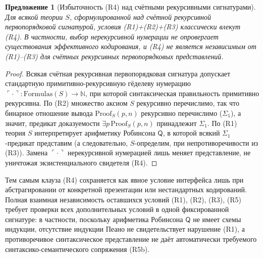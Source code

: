 \documentclass[11pt]{article}
\theoremstyle{plain}
\newtheorem{proposition}[theorem]{Предложение}
\theoremstyle{definition}
\begin{document}
\begin{proposition}[Избыточность (R4) над счётными рекурсивными сигнатурами]\label{prop:rs-independence}
Для всякой теории $S$, сформулированной над счётной рекурсивной первопорядковой сигнатурой, условия \textup{(R1)+(R2)+(R3)} классически влекут \textup{(R4)}. В частности, выбор нерекурсивной нумерации не опровергает существования эффективного кодирования, и \textup{(R4)} не является независимым от \textup{(R1)--(R3)} для счётных рекурсивных первопорядковых представлений.
\end{proposition}
\begin{proof}
Всякая счётная рекурсивная первопорядковая сигнатура допускает стандартную примитивно-рекурсивную гёделеву нумерацию $\ulcorner \cdot \urcorner : \mathrm{Formulas}(S) \to \mathbb{N}$, при которой синтаксическая правильность примитивно рекурсивна. По (R2) множество аксиом $S$ рекурсивно перечислимо, так что бинарное отношение вывода $\mathrm{Proof}_S(p, n)$ рекурсивно перечислимо ($\Sigma_1$), а значит, предикат доказуемости $\exists p\,\mathrm{Proof}_S(p, n)$ принадлежит $\Sigma_1$. По (R1) теория $S$ интерпретирует арифметику Робинсона $\mathsf{Q}$, в которой всякий $\Sigma_1$-предикат представим (а следовательно, $S$-определим, при непротиворечивости из (R3)). Замена $\ulcorner \cdot \urcorner$ нерекурсивной нумерацией лишь меняет представление, не уничтожая экзистенциального свидетеля (R4).
\end{proof}
Тем самым клауза (R4) сохраняется как явное условие интерфейса лишь при абстрагировании от конкретной презентации или нестандартных кодирований. Полная взаимная независимость оставшихся условий (R1), (R2), (R3), (R5) требует проверки всех дополнительных условий в одной фиксированной сигнатуре: в частности, поскольку арифметика Робинсона $\mathsf{Q}$ не имеет схемы индукции, отсутствие индукции Пеано не свидетельствует нарушение (R1), а противоречивое синтаксическое представление не даёт автоматически требуемого синтаксико-семантического сопряжения (R5b).
\end{document}

